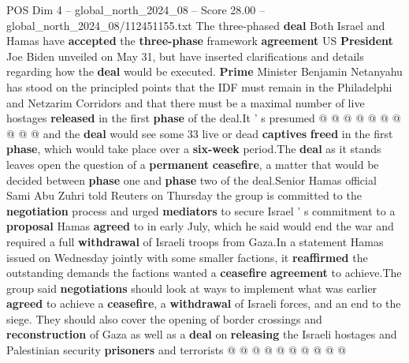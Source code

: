 \begin{textsample}{POS Dim 4 – global\_north\_2024\_08 – Score 28.00 – global\_north\_2024\_08/112451155.txt}
The three-phased \textbf{deal} Both Israel and Hamas have \textbf{accepted} the \textbf{three-phase} framework \textbf{agreement} US \textbf{President} Joe Biden unveiled on May 31, but have inserted clarifications and details regarding how the \textbf{deal} would be executed. \textbf{Prime} Minister Benjamin Netanyahu has stood on the principled points that the IDF must remain in the Philadelphi and Netzarim Corridors and that there must be a maximal number of live hostages \textbf{released} in the first \textbf{phase} of the deal.It ' s presumed @ @ @ @ @ @ @ @ @ @ and the \textbf{deal} would see some 33 live or dead \textbf{captives} \textbf{freed} in the first \textbf{phase}, which would take place over a \textbf{six-week} period.The \textbf{deal} as it stands leaves open the question of a \textbf{permanent} \textbf{ceasefire}, a matter that would be decided between \textbf{phase} one and \textbf{phase} two of the deal.Senior Hamas official Sami Abu Zuhri told Reuters on Thursday the group is committed to the \textbf{negotiation} process and urged \textbf{mediators} to secure Israel ' s commitment to a \textbf{proposal} Hamas \textbf{agreed} to in early July, which he said would end the war and required a full \textbf{withdrawal} of Israeli troops from Gaza.In a statement Hamas issued on Wednesday jointly with some smaller factions, it \textbf{reaffirmed} the outstanding demands the factions wanted a \textbf{ceasefire} \textbf{agreement} to achieve.The group said \textbf{negotiations} should look at ways to implement what was earlier \textbf{agreed} to achieve a \textbf{ceasefire}, a \textbf{withdrawal} of Israeli forces, and an end to the siege.
They should also cover the opening of border crossings and \textbf{reconstruction} of Gaza as well as a \textbf{deal} on \textbf{releasing} the Israeli hostages and Palestinian security \textbf{prisoners} and terrorists @ @ @ @ @ @ @ @ @ @

\end{textsample}
